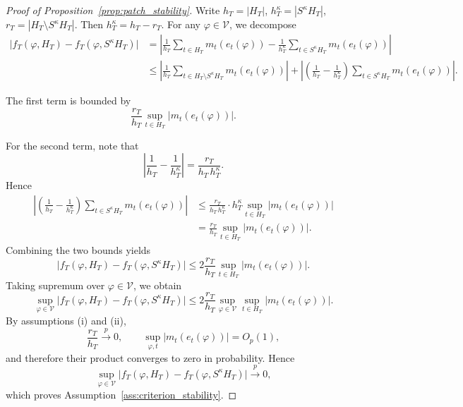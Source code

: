\documentclass[12pt]{article}
\numberwithin{equation}{section}
\begin{document}
\begin{proof}[Proof of Proposition~\ref{prop:patch_stability}]

Write
$h_T = |H_T|$,
$h_T^\kappa = |S^\kappa H_T|$,
$r_T = |H_T\setminus S^\kappa H_T|$.
Then $h_T^\kappa = h_T - r_T$.
For any $\varphi\in\mathcal V$, we decompose
\begin{align}
\bigl|f_T(\varphi,H_T)-f_T(\varphi,S^\kappa H_T)\bigr|
&=
\left|
\frac{1}{h_T}\sum_{t\in H_T} m_t(e_t(\varphi))
-
\frac{1}{h_T^\kappa}\sum_{t\in S^\kappa H_T} m_t(e_t(\varphi))
\right| \nonumber \\
&\le
\left|
\frac{1}{h_T}\sum_{t\in H_T\setminus S^\kappa H_T} m_t(e_t(\varphi))
\right|
+
\left|
\left(
\frac{1}{h_T}-\frac{1}{h_T^\kappa}
\right)
\sum_{t\in S^\kappa H_T} m_t(e_t(\varphi))
\right|.
\end{align}

The first term is bounded by
\begin{equation}
\frac{r_T}{h_T}
\sup_{t\in H_T} |m_t(e_t(\varphi))|.
\end{equation}

For the second term, note that
\begin{equation}
\left|
\frac{1}{h_T}-\frac{1}{h_T^\kappa}
\right|
=
\frac{r_T}{h_T\,h_T^\kappa}.
\end{equation}
Hence
\begin{align}
\left|
\left(
\frac{1}{h_T}-\frac{1}{h_T^\kappa}
\right)
\sum_{t\in S^\kappa H_T} m_t(e_t(\varphi))
\right|
&\le
\frac{r_T}{h_T\,h_T^\kappa}
\cdot
h_T^\kappa
\sup_{t\in H_T} |m_t(e_t(\varphi))| \\
&=
\frac{r_T}{h_T}
\sup_{t\in H_T} |m_t(e_t(\varphi))|.
\end{align}
Combining the two bounds yields
\begin{equation}
\bigl|f_T(\varphi,H_T)-f_T(\varphi,S^\kappa H_T)\bigr|
\le
2\frac{r_T}{h_T}
\sup_{t\in H_T} |m_t(e_t(\varphi))|.
\end{equation}
Taking supremum over $\varphi\in\mathcal V$, we obtain
\begin{equation}
\sup_{\varphi\in\mathcal V}
\bigl|f_T(\varphi,H_T)-f_T(\varphi,S^\kappa H_T)\bigr|
\le
2\frac{r_T}{h_T}
\sup_{\varphi\in\mathcal V}\sup_{t\in H_T}
|m_t(e_t(\varphi))|.
\end{equation}
By assumptions (i) and (ii),
\begin{equation}
\frac{r_T}{h_T} \overset{p}{\longrightarrow} 0,
\qquad
\sup_{\varphi,t}|m_t(e_t(\varphi))| = O_p(1),
\end{equation}
and therefore their product converges to zero in probability. Hence
\begin{equation}
\sup_{\varphi\in\mathcal V}
\bigl|f_T(\varphi,H_T)-f_T(\varphi,S^\kappa H_T)\bigr|
\overset{p}{\longrightarrow}0,
\end{equation}
which proves Assumption~\ref{ass:criterion_stability}.
\end{proof}
\end{document}
